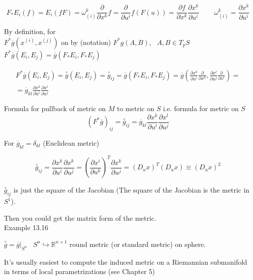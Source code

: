 \documentclass[11pt]{amsart}
\theoremstyle{definition}
\begin{document}
\[
F_* E_i(f) = E_i(fF) = \omega^k_{(i)} \frac{ \partial }{ \partial x^k}f = \frac{ \partial }{ \partial u^i} f(F(u)) = \frac{ \partial f}{ \partial x^k } \frac{ \partial x^k }{ \partial u^i } \quad \quad \, \omega_{(i)}^k = \frac{ \partial x^k}{ \partial u^i }
\]

By definition, for  \\
\quad $F^*\overline{g}(x^{(i)}, x^{(j)})$ on by (notation) $F^*g(A,B)$, \, $A,B \in T_pS$ \\
\quad $F^*\overline{g}(E_i, E_j) = \overline{g}(F_* E_i, F_* E_j)$

\[
\begin{gathered}
  F^*\overline{g}(E_i,E_j) = \overset{\circ}{g}(E_i, E_j) = \overset{\circ}{g}_{ij} = \overline{g}(F_* E_i, F_* E_j) = \overline{g}{ \left( \frac{ \partial x^k}{ \partial u^i } \frac{ \partial }{ \partial x^k} , \frac{ \partial x^l }{ \partial u^j } \frac{ \partial }{ \partial x^l } \right) } = \\
  = \overline{g}_{kl} \frac{ \partial x^k}{ \partial u^i } \frac{ \partial x^l }{ \partial u^j }
\end{gathered}
\]

Formula for pullback of metric on $M$ to metric on $S$ i.e. formula for metric on $S$
\[
\boxed{ (F^* \overline{g} )_{ij} = \overset{\circ}{g}_{ij} = \overline{g}_{kl} \frac{ \partial x^k}{ \partial u^i } \frac{ \partial x^l }{ \partial u^j } }
\]

For $\overline{g}_{kl} = \delta_{kl}$ (Euclidean metric)

\[
\overset{\circ}{g}_{ij} = \frac{ \partial x^k}{ \partial u^i } \frac{ \partial x^k}{ \partial u^j } = \left( \frac{ \partial x^i }{ \partial u^k } \right)^T \frac{ \partial x^k}{ \partial u^j } = (D_u x)^T (D_u x) \equiv (D_u x)^2
\]

$\overset{\circ}{g}_{ij}$ is just the square of the Jacobian (The square of the Jacobian is the metric in $S^1$).

Then you could get the matrix form of the metric.  \\






Example 13.16

$\overset{ \circ}{g} = \left. \overline{g} \right|_{S^n}$  \quad \, $S^n \hookrightarrow \mathbb{R}^{n+1}$ round metric (or standard metric) on sphere.




It's usually easiest to compute the induced metric on a Riemannian submanifold in terms of local parametrizations (see Chapter 5)
\end{document}
